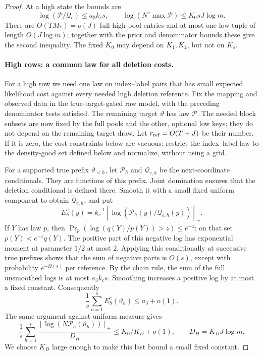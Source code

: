 \begin{proof}
At a high state the bounds are
\[
 \log(\mathcal P/\mathcal Q_c)\le a_3k_cs,\qquad
 \log(N^s\max\mathcal P)\le K_0sJ\log m.
\]
There are \(O(TM_*)=o(J)\) full high-pool entries and at most one low
tuple of length \(O(J\log m)\); together with the prior and denominator
bounds these give the second inequality. The fixed \(K_0\) may depend
on \(K_1,K_2\), but not on \(K_s\).

\paragraph{High rows: a common law for all deletion costs.}
For a high row we need one law on index--label pairs that has small
expected likelihood cost against every needed high deletion reference.
Fix the mapping and observed data in the true-target-gated raw model,
with the preceding denominator tests satisfied. The remaining target \(\vartheta\) has law \(\mathcal P\). The needed
block subsets are now fixed by the full pools and the other, optional
low keys; they do not depend on the remaining target draw. Let
\(r_{\rm ref}=O(T+J)\) be their number. If it is zero, the cost
constraints below are vacuous: restrict the index--label law to the
density-good set defined below and normalize, without using a grid.

For a supported true prefix \(\vartheta_{<h}\), let
\(\mathcal P_h\) and \(\mathcal Q_{c,h}\) be the next-coordinate
conditionals. They are functions of this prefix. Joint domination ensures
that the deletion conditional is defined there. Smooth it with a small
fixed uniform component to obtain \(\widetilde{\mathcal Q}_{c,h}\),
and put
\[
 E_h^c(y)=k_c^{-1}
   [\log(\mathcal P_h(y)/\widetilde{\mathcal Q}_{c,h}(y))]_+.
\]
If \(Y\) has law \(p\), then
\(\Pr_p(\log(q(Y)/p(Y))>z)\le e^{-z}\): on that set
\(p(Y)<e^{-z}q(Y)\). The positive part of this negative log has
exponential moment at parameter \(1/2\) at most \(2\). Applying this
conditionally at successive true prefixes shows that the sum of negative
parts is \(O(s)\), except with probability \(e^{-\Omega(s)}\) per
reference. By the chain rule, the sum of the full unsmoothed logs is at
most \(a_3k_cs\). Smoothing increases a positive log by at most a
fixed constant. Consequently
\[
 \frac1s\sum_{h=1}^s E_h^c(\vartheta_h)\le a_3+o(1).
\]
The same argument against uniform measure gives
\[
 \frac1s\sum_{h=1}^s
 \frac{[\log(N\mathcal P_h(\vartheta_h))]_+}{D_H}
 \le K_0/K_D+o(1),\qquad D_H=K_DJ\log m.
\]
We choose \(K_D\) large enough to make this last bound a small fixed
constant.


\end{proof}
